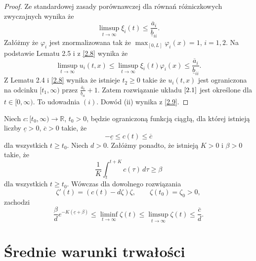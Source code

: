 	\begin{proof}
		Ze standardowej zasady porównawczej dla równań różniczkowych zwyczajnych wynika że
		\begin{equation}
		\label{2.8}
		\limsup_{t\to \infty} \xi_i(t)\le \frac{\overline{a}_i}{\underline{b}_{ii}}.
	\end{equation}
	Załóżmy że $\varphi_i$ jest znormalizowana tak że $\max_{[0,L]} \varphi_i(x)=1$, $i=1,2$. 
	Na podstawie Lematu 2.5 i z  \eqref{2.8} wynika że
	\begin{equation}
		\label{2.9}
		\limsup_{t \to \infty}u_i(t,x) \le \limsup_{t \to \infty} \xi_i(t)\varphi_i(x) \le \frac{\overline{a}_i}{\underline{b}_{ii}}.
	\end{equation}
	Z Lematu 2.4 i \eqref{2.8} wynika że istnieje  $t_2\geq 0$ takie że
	 $u_i(t,x)$ jest ograniczona na odcinku $[t_1,\infty)$ przez 
	$\frac{\overline{a}_{i}}{\underline{b}_{ii}}+1$.
	Zatem rozwiązanie układu $\eqref{2.1}$ jest określone dla $t\in [0,\infty)$. To udowadnia  $(i)$. Dowód (ii) wynika z \eqref{2.9}.
	
	
	
	\end{proof}
	
	\begin{lemma}
		Niech $c:[t_0,\infty)\to\mathbb{R}$, $t_0>0$, będzie ograniczoną funkcją ciągłą, dla której istnieją liczby $\underline{c}>0$, $\overline{c}>0$ takie, że
		\begin{equation}
		-\underline{c}\le c(t)\le \overline{c}
		\end{equation}
		dla wszystkich $t\ge t_0$.  
		Niech $d>0$. Załóżmy ponadto, że istnieją $K>0$ i $\beta>0$ takie, że
		\begin{equation}
		\frac{1}{K}\int_{t}^{t+K} c(\tau)\,d\tau \ge \beta
		\end{equation}
		dla wszystkich $t\ge t_0$.  
		Wówczas dla dowolnego rozwiązania
		\begin{equation}
		\zeta'(t)=(c(t)-d\zeta)\zeta,\qquad \zeta(t_0)=\zeta_0>0,
		\end{equation}
		zachodzi
		\begin{equation}
		\frac{\beta}{d}e^{-K(\underline{c}+\beta)}
		\le \liminf_{t\to\infty} \zeta(t)
		\le \limsup_{t\to\infty} \zeta(t)
		\le \frac{\overline{c}}{d}.
		\end{equation}
	\end{lemma}
	
	\section{Średnie warunki trwałości}
	
